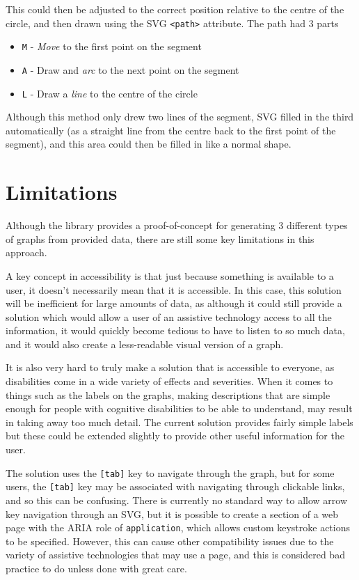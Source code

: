 \documentclass[ %
                    author={Aleena Baig},
                supervisor={Dr Simon Lock},
                    degree={BSc},
                     title={On Making Web Accessible Graphs},
                  subtitle={},
                      year={2019} ]{dissertation}
\begin{document}
This could then be adjusted to the correct position relative to the centre of the circle, and then drawn using the SVG \texttt{<path>} attribute. The path had 3 parts

\begin{itemize}
    \item \texttt{M} - \textit{Move} to the first point on the segment
    \item \texttt{A} - Draw and \textit{arc} to the next point on the segment
    \item \texttt{L} - Draw a \textit{line} to the centre of the circle
\end{itemize}

Although this method only drew two lines of the segment, SVG filled in the third automatically (as a straight line from the centre back to the first point of the segment), and this area could then be filled in like a normal shape.


\section{Limitations}

Although the library provides a proof-of-concept for generating 3 different types of graphs from provided data, there are still some key limitations in this approach.

A key concept in accessibility is that just because something is available to a user, it doesn't necessarily mean that it is accessible. In this case, this solution will be inefficient for large amounts of data, as although it could still provide a solution which would allow a user of an assistive technology access to all the information, it would quickly become tedious to have to listen to so much data, and it would also create a less-readable visual version of a graph.

It is also very hard to truly make a solution that is accessible to everyone, as disabilities come in a wide variety of effects and severities. When it comes to things such as the labels on the graphs, making descriptions that are simple enough for people with cognitive disabilities to be able to understand, may result in taking away too much detail. The current solution provides fairly simple labels but these could be extended slightly to provide other useful information for the user.

The solution uses the \texttt{[tab]} key to navigate through the graph, but for some users, the \texttt{[tab]} key may be associated with navigating through clickable links, and so this can be confusing. There is currently no standard way to allow arrow key navigation through an SVG, but it is possible to create a section of a web page with the ARIA role of \texttt{application}, which allows custom keystroke actions to be specified. However, this can cause other compatibility issues due to the variety of assistive technologies that may use a page, and this is considered bad practice to do unless done with great care.
\end{document}
